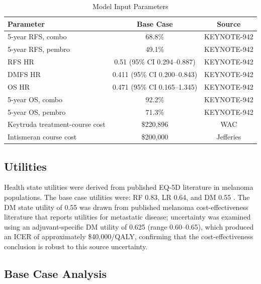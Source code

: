 \documentclass[12pt,a4paper]{article}
\begin{document}
\begin{table}[H]
\centering
\caption{Model Input Parameters}
\label{tab:inputs}
\begin{tabular}{lcc}
\toprule
\textbf{Parameter} & \textbf{Base Case} & \textbf{Source} \\
\midrule
5-year RFS, combo   & 68.8\%            & \mbox{KEYNOTE-942} \cite{khattak2026} \\
5-year RFS, pembro  & 49.1\%            & \mbox{KEYNOTE-942} \cite{khattak2026} \\
RFS HR              & 0.51 (95\% CI 0.294--0.887) & \mbox{KEYNOTE-942} \cite{khattak2026} \\
DMFS HR             & 0.411 (95\% CI 0.200--0.843) & \mbox{KEYNOTE-942} \cite{khattak2026} \\
OS HR               & 0.471 (95\% CI 0.165--1.345) & \mbox{KEYNOTE-942} \cite{khattak2026} \\
5-year OS, combo    & 92.2\%            & \mbox{KEYNOTE-942} \cite{khattak2026} \\
5-year OS, pembro   & 71.3\%            & \mbox{KEYNOTE-942} \cite{khattak2026} \\
Keytruda treatment-course cost & \$220,896        & WAC \cite{keytruda2026} \\
Intismeran course cost & \$200,000       & Jefferies \cite{jefferies2026} \\
\bottomrule
\end{tabular}
\end{table}


\subsection{Utilities}

Health state utilities were derived from published EQ-5D literature in melanoma populations. The base case utilities were: RF 0.83, LR 0.64, and DM 0.55 \cite{bensimon2019, tran2021, zhang2023}. The DM state utility of 0.55 was drawn from published melanoma cost-effectiveness literature that reports utilities for metastatic disease; uncertainty was examined using an adjuvant-specific DM utility of 0.625 (range 0.60--0.65), which produced an ICER of approximately \$40,000/QALY, confirming that the cost-effectiveness conclusion is robust to this source uncertainty.

\subsection{Base Case Analysis}
\end{document}
